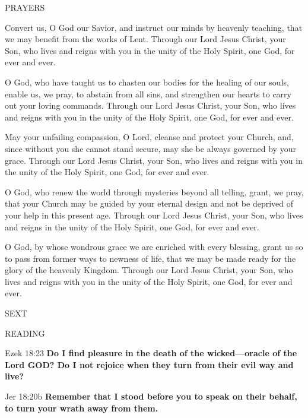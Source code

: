 \noindent\small PRAYERS
\begin{description}[labelindent=\parindent, leftmargin=*]
\item [Week 1:] 	Convert us, O God our Savior, and instruct our minds by heavenly teaching, that we may benefit from the works of Lent. Through our Lord Jesus Christ, your Son, who lives and reigns with you in the unity of the Holy Spirit, one God, for ever and ever.
\item [Week 2:] 	O God, who have taught us to chasten our bodies for the healing of our souls, enable us, we pray, to abstain from all sins, and strengthen our hearts to carry out your loving commands. Through our Lord Jesus Christ, your Son, who lives and reigns with you in the unity of the Holy Spirit, one God, for ever and ever.
\item [Week 3:] 	May your unfailing compassion, O Lord, cleanse and protect your Church, and, since without you she cannot stand secure, may she be always governed by your grace. Through our Lord Jesus Christ, your Son, who lives and reigns with you in the unity of the Holy Spirit, one God, for ever and ever.
\item [Week 4:] 	O God, who renew the world through mysteries beyond all telling, grant, we pray, that your Church may be guided by your eternal design and not be deprived of your help in this present age. Through our Lord Jesus Christ, your Son, who lives and reigns in the unity of the Holy Spirit, one God, for ever and ever.
\item [Week 5:] 	O God, by whose wondrous grace we are enriched with every blessing, grant us so to pass from former ways to newness of life, that we may be made ready for the glory of the heavenly Kingdom. Through our Lord Jesus Christ, your Son, who lives and reigns with you in the unity of the Holy Spirit, one God, for ever and ever.
\end{description}

\begin{flushleft}\normalsize{\uppercase{SEXT\\}}\end{flushleft}
\noindent\small READING
\begin{description}[labelindent=\parindent, leftmargin=*]
\item [Weeks 1-4:]     Ezek 18:23 \textbf{    Do I find pleasure in the death of the wicked—oracle of the Lord GOD? Do I not rejoice when they turn from their evil way and live? \\}
\item [Week 5:]    Jer 18:20b    \textbf{Remember that I stood before you to speak on their behalf, to turn your wrath away from them.}
\end{description}

